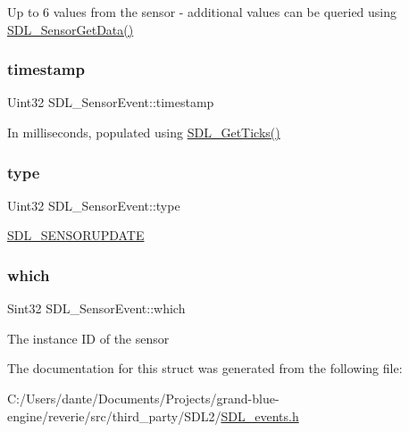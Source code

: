 Up to 6 values from the sensor -\/ additional values can be queried using \mbox{\hyperlink{_s_d_l__sensor_8h_a22466ee6b7af791937ebf1f7b76ed56b}{S\+D\+L\+\_\+\+Sensor\+Get\+Data()}} \mbox{\label{struct_s_d_l___sensor_event_a7de6c2b4d4791f5553b5de225293ceb5}} 
\subsubsection{\texorpdfstring{timestamp}{timestamp}}
{\footnotesize\ttfamily Uint32 S\+D\+L\+\_\+\+Sensor\+Event\+::timestamp}

In milliseconds, populated using \mbox{\hyperlink{_s_d_l__timer_8h_a0b9bc71d6287e0ffafdc3419760fe2b3}{S\+D\+L\+\_\+\+Get\+Ticks()}} \mbox{\label{struct_s_d_l___sensor_event_a0173d64fbe5299cad956298faf3fb0f9}} 
\subsubsection{\texorpdfstring{type}{type}}
{\footnotesize\ttfamily Uint32 S\+D\+L\+\_\+\+Sensor\+Event\+::type}

\mbox{\hyperlink{_s_d_l__events_8h_a3b589e89be6b35c02e0dd34a55f3fccaa1536ed6dfb1cdb20da84b7e2c602c022}{S\+D\+L\+\_\+\+S\+E\+N\+S\+O\+R\+U\+P\+D\+A\+TE}} \mbox{\label{struct_s_d_l___sensor_event_aa1c130192bad9b316f811f2d138b3b22}} 
\subsubsection{\texorpdfstring{which}{which}}
{\footnotesize\ttfamily Sint32 S\+D\+L\+\_\+\+Sensor\+Event\+::which}

The instance ID of the sensor 

The documentation for this struct was generated from the following file\+:\begin{DoxyCompactItemize}
\item 
C\+:/\+Users/dante/\+Documents/\+Projects/grand-\/blue-\/engine/reverie/src/third\+\_\+party/\+S\+D\+L2/\mbox{\hyperlink{_s_d_l__events_8h}{S\+D\+L\+\_\+events.\+h}}\end{DoxyCompactItemize}
